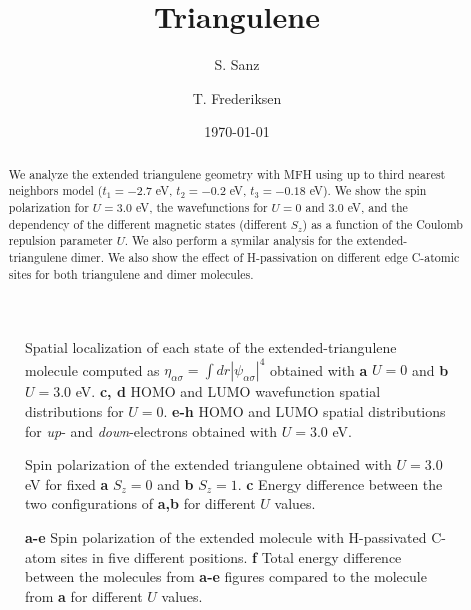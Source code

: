 \documentclass[twocolumn,amsmath,%
amssymb,prb,superscriptaddress]{revtex4}
\begin{document}
\title{Triangulene}

\author{S. Sanz}

\author{T. Frederiksen}

\date{\today}

\begin{abstract}
We analyze the extended triangulene geometry with MFH using up to third nearest neighbors model ($t_{1}=-2.7$ eV, $t_{2}=-0.2$ eV, $t_{3}=-0.18$ eV). We show the spin polarization for $ U=3.0$ eV, the wavefunctions for $U=0$ and $3.0$ eV, and the dependency of the different magnetic states (different $S_{z}$) as a function of the Coulomb repulsion parameter $U$. We also perform a symilar analysis for the extended-triangulene dimer. We also show the effect of H-passivation on different edge C-atomic sites for both triangulene and dimer molecules.
\end{abstract}

\maketitle



\begin{figure*}
	\scalebox{.7}{}
	\caption{Spatial localization of each state of the extended-triangulene molecule computed as $\eta_{\alpha\sigma}=\int dr|\psi_{\alpha\sigma}|^{4}$ obtained with \textbf{a} $U=0$ and \textbf{b} $U=3.0$ eV. \textbf{c, d} HOMO and LUMO wavefunction spatial distributions for $U=0$. \textbf{e-h} HOMO and LUMO spatial distributions for \emph{up}- and \emph{down}-electrons obtained with $U=3.0$ eV.}
\end{figure*}

\begin{figure*}
	\scalebox{.5}{}
	\caption{Spin polarization of the extended triangulene obtained with $U=3.0$ eV for fixed \textbf{a} $S_{z}=0$ and \textbf{b} $S_{z}=1$. \textbf{c} Energy difference between the two configurations of \textbf{a,b} for different $U$ values.}
\end{figure*}

\begin{figure*}
	\scalebox{.4}{}
	\caption{\textbf{a-e} Spin polarization of the extended molecule with H-passivated C-atom sites in five different positions. \textbf{f} Total energy difference between the molecules from \textbf{a-e} figures compared to the molecule from \textbf{a} for different $U$ values.}
\end{figure*}
\end{document}
